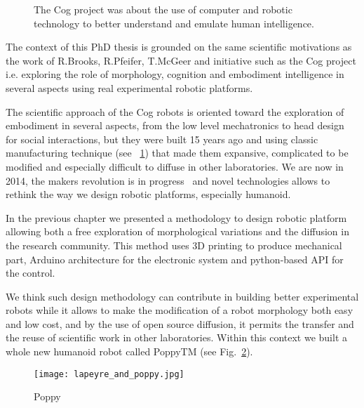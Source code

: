 

\begin{figure}[t]
\centering
    \hfil
    \caption{The Cog project was about the use of computer and robotic technology to better understand and emulate human intelligence.}
    \label{fig:cog_project}
\end{figure}



The context of this PhD thesis is grounded on the same scientific motivations as the work of R.Brooks, R.Pfeifer, T.McGeer and initiative such as the Cog project i.e. exploring the role of morphology, cognition and embodiment intelligence in several aspects using real experimental robotic platforms.

The scientific approach of the Cog robots is oriented toward the exploration of embodiment in several aspects, from the low level mechatronics to head design for social interactions, but they were built 15 years ago and using classic manufacturing technique (see \figurename~\ref{fig:cog_project}) that made them expansive, complicated to be modified and especially difficult to diffuse in other laboratories.
We are now in 2014, the makers revolution is in progress~\cite{anderson} and novel technologies allows to rethink the way we design robotic platforms, especially humanoid.

In the previous chapter we presented a methodology to design robotic platform allowing both a free exploration of morphological variations and the diffusion in the research community. This method uses 3D printing to produce mechanical part, Arduino architecture for the electronic system and python-based API for the control.

We think such design methodology can contribute in building better experimental robots while it allows to make the modification of a robot morphology both easy and low cost, and by the use of open source diffusion, it permits the transfer and the reuse of scientific work in other laboratories.
Within this context we built a whole new humanoid robot called PoppyTM (see Fig.~\ref{fig:poppy_with_me}).

\begin{figure}[tb]
    \begin{center}
        \texttt{[image: lapeyre\_and\_poppy.jpg]}
    \end{center}
    \caption{Poppy}
    \label{fig:poppy_with_me}
\end{figure}

